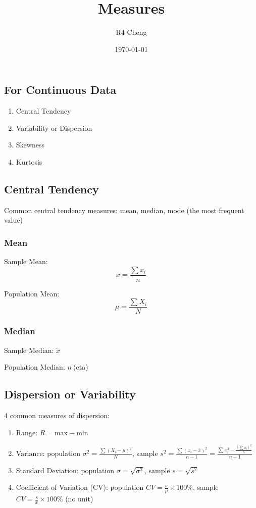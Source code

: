 \documentclass[12pt,a4paper]{article}
\title{Measures}
\author{R4 Cheng}
\date{\today}
\begin{document}
\maketitle

\subsection*{For Continuous Data}

\begin{enumerate}
    \item Central Tendency
    \item Variability or Dispersion
    \item Skewness
    \item Kurtosis
\end{enumerate}

\subsection*{Central Tendency}

Common central tendency measures: mean, median, mode (the most frequent value)

\subsubsection*{Mean}

Sample Mean:
\[
\bar{x} = \frac{\sum x_i}{n}
\]

Population Mean:
\[
\mu = \frac{\sum X_i}{N}
\]

\subsubsection*{Median}

Sample Median: $\tilde{x}$

Population Median: $\eta$ (eta)

\subsection*{Dispersion or Variability}

4 common measures of dispersion:

\begin{enumerate}
    \item Range: $R = \text{max} - \text{min}$
    \item Variance: population $\sigma^2 = \frac{\sum (X_i - \mu)^2}{N}$, sample $s^2 = \frac{\sum (x_i - \bar{x})^2}{n-1} = \frac{\sum x_i^2 - \frac{(\sum x_i)^2}{n}}{n-1} $
    \item Standard Deviation: population $\sigma = \sqrt{\sigma^2}$, sample $s = \sqrt{s^2}$
    \item Coefficient of Variation (CV): population $CV = \frac{\sigma}{\mu} \times 100\%$, sample $CV = \frac{s}{\bar{x}} \times 100\%$ (no unit)
\end{enumerate}
\end{document}
